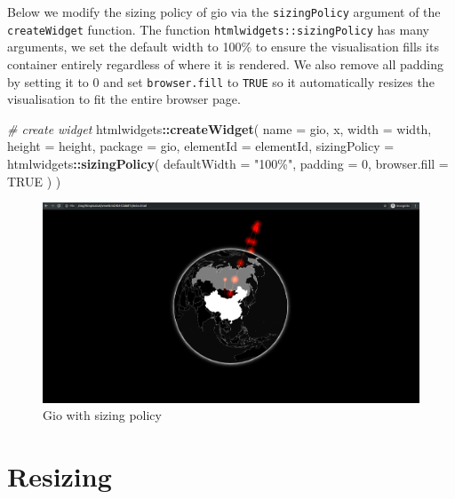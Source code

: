 \documentclass[
]{krantz}
\makeatletter
\newenvironment{Shaded}{\begin{snugshade}}{\end{snugshade}}
\newcommand{\CommentTok}[1]{\textcolor[rgb]{0.37,0.37,0.37}{\textit{#1}}}
\newcommand{\DataTypeTok}[1]{\textcolor[rgb]{0.27,0.27,0.27}{#1}}
\newcommand{\DecValTok}[1]{\textcolor[rgb]{0.06,0.06,0.06}{#1}}
\newcommand{\KeywordTok}[1]{\textcolor[rgb]{0.27,0.27,0.27}{\textbf{#1}}}
\newcommand{\NormalTok}[1]{#1}
\newcommand{\OperatorTok}[1]{\textcolor[rgb]{0.43,0.43,0.43}{\textbf{#1}}}
\newcommand{\OtherTok}[1]{\textcolor[rgb]{0.37,0.37,0.37}{#1}}
\newcommand{\StringTok}[1]{\textcolor[rgb]{0.5,0.5,0.5}{#1}}
\newenvironment{kframe}{%
\medskip{}
\setlength{\fboxsep}{.8em}
 \def\at@end@of@kframe{}%
 \ifinner\ifhmode%
  \def\at@end@of@kframe{\end{minipage}}%
  \begin{minipage}{\columnwidth}%
 \fi\fi%
 \def\FrameCommand##1{\hskip\@totalleftmargin \hskip-\fboxsep
 \colorbox{shadecolor}{##1}\hskip-\fboxsep
     \hskip-\linewidth \hskip-\@totalleftmargin \hskip\columnwidth}%
 \MakeFramed {\advance\hsize-\width
   \@totalleftmargin\z@ \linewidth\hsize
   \@setminipage}}%
 {\par\unskip\endMakeFramed%
 \at@end@of@kframe}
\renewenvironment{Shaded}{\begin{kframe}}{\end{kframe}}
\makeatother
\begin{document}
Below we modify the sizing policy of gio via the \texttt{sizingPolicy} argument of the \texttt{createWidget} function. The function \texttt{htmlwidgets::sizingPolicy} has many arguments, we set the default width to 100\% to ensure the visualisation fills its container entirely regardless of where it is rendered. We also remove all padding by setting it to 0 and set \texttt{browser.fill} to \texttt{TRUE} so it automatically resizes the visualisation to fit the entire browser page.

\begin{Shaded}
\begin{Highlighting}[]
\CommentTok{\# create widget}
\NormalTok{htmlwidgets}\OperatorTok{::}\KeywordTok{createWidget}\NormalTok{(}
  \DataTypeTok{name =} \StringTok{\textquotesingle{}gio\textquotesingle{}}\NormalTok{,}
\NormalTok{  x,}
  \DataTypeTok{width =}\NormalTok{ width,}
  \DataTypeTok{height =}\NormalTok{ height,}
  \DataTypeTok{package =} \StringTok{\textquotesingle{}gio\textquotesingle{}}\NormalTok{,}
  \DataTypeTok{elementId =}\NormalTok{ elementId,}
  \DataTypeTok{sizingPolicy =}\NormalTok{ htmlwidgets}\OperatorTok{::}\KeywordTok{sizingPolicy}\NormalTok{(}
    \DataTypeTok{defaultWidth =} \StringTok{"100\%"}\NormalTok{,}
    \DataTypeTok{padding =} \DecValTok{0}\NormalTok{,}
    \DataTypeTok{browser.fill =} \OtherTok{TRUE}
\NormalTok{  )}
\NormalTok{)}
\end{Highlighting}
\end{Shaded}

\begin{figure}
\centering
\includegraphics{images/gio-fit.png}
\caption{Gio with sizing policy}
\end{figure}

\hypertarget{resizing}{%
\section*{Resizing}\label{resizing}}
\end{document}
